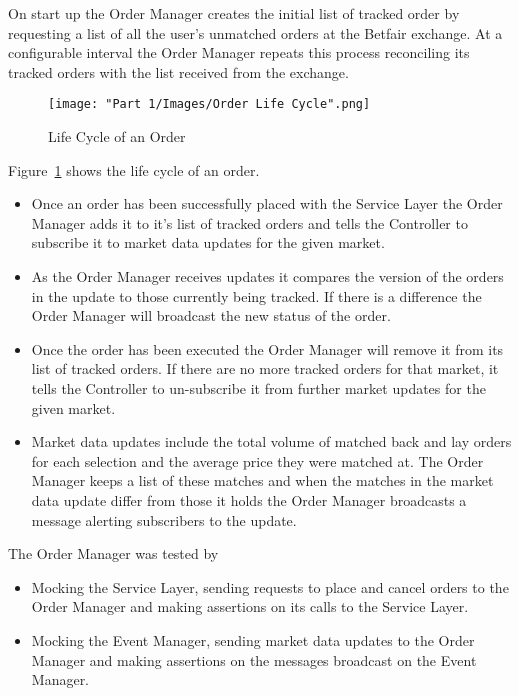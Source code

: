 	On start up the Order Manager creates the initial list of tracked order by requesting a list of all the user's unmatched orders at the Betfair exchange. At a configurable interval the Order Manager repeats this process reconciling its tracked orders with the list received from the exchange.
	
	\begin{figure}[H]
		\texttt{[image: "Part 1/Images/Order Life Cycle".png]}
		\centering
		\caption{Life Cycle of an Order}
    		\label{fig:orderLifeCycle}
	\end{figure}	
	
	Figure~\ref{fig:orderLifeCycle} shows the life cycle of an order. 
	
	\begin{itemize}
		\item Once an order has been successfully placed with the Service Layer the Order Manager adds it to it's list of tracked orders and tells the Controller to subscribe it to market data updates for the given market.
		\item As the Order Manager receives updates it compares the version of the orders in the update to those currently being tracked. If there is a difference the Order Manager will broadcast the new status of the order.
		\item Once the order has been executed the Order Manager will remove it from its list of tracked orders. If there are no more tracked orders for that market, it tells the Controller to un-subscribe it from further market updates for the given market.
		\item Market data updates include the total volume of matched back and lay orders for each selection and the average price they were matched at. The Order Manager keeps a list of these matches and when the matches in the market data update differ from those it holds the Order Manager broadcasts a message alerting subscribers to the update.
	\end{itemize}
	
	The Order Manager was tested by
	\begin{itemize}
		\item Mocking the Service Layer, sending requests to place and cancel orders to the Order Manager and making assertions on its calls to the Service Layer.
		\item Mocking the Event Manager, sending market data updates to the Order Manager and making assertions on the messages broadcast on the Event Manager.
	\end{itemize} 

